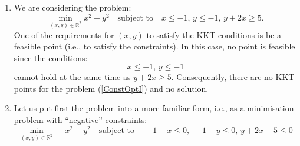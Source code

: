 \documentclass{ExerciseSheet}
\begin{document}
\begin{solution}
\begin{enumerate}[1.]
	\item We are considering the problem:
	\begin{equation}\label{ConstOptI}
        \min_{(x,y)\in\mathbb{R}^2} x^2+y^2 \quad \text{subject to} \quad x\leq -1,\, y\leq -1, \, y+2x\geq 5.
    \end{equation}
	One of the requirements for $(x,y)$ to satisfy the KKT conditions is be a feasible point (i.e., to satisfy the constraints). In this case, no point is feasible since the conditions:
	\[x\leq -1,\, y\leq -1\]
	cannot hold at the same time as $y+2x\geq 5$. Consequently, there are no KKT points for the problem (\ref{ConstOptI}) and no solution. 
    \item 
    Let us put first the problem into a more familiar form, i.e., as a minimisation problem with ``negative'' constraints:
    \begin{equation}\label{ConstOptII}
    \min_{(x,y)\in\mathbb{R}^2} -x^2-y^2 \quad \text{subject to} \quad -1-x\leq 0,\, -1-y\leq 0, \, y+2x-5\leq 0
		\end{equation}
    

\end{enumerate}
\end{solution}
\end{document}
